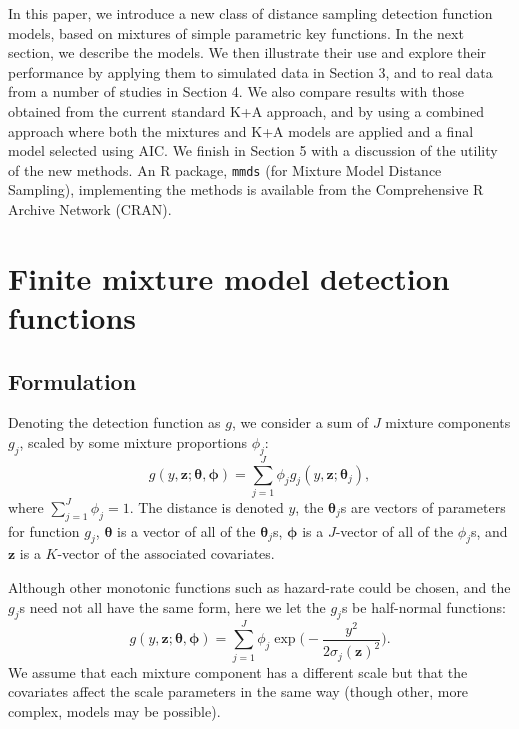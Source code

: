 \documentclass[authoryear,preprint,review,12pt]{elsarticle}
\begin{document}
In this paper, we introduce a new class of distance sampling detection function models, based on mixtures of simple parametric key functions.  In the next section, we describe the models.  We then illustrate their use and explore their performance by applying them to simulated data in Section 3, and to real data from a number of studies in Section 4. We also compare results with those obtained from the current standard K+A approach, and by using a combined approach where both the mixtures and K+A models are applied and a final model selected using AIC.  We finish in Section 5 with a discussion of the utility of the new methods.  An \textsf{R} \citep{Team:2013wf} package, \texttt{mmds} (for Mixture Model Distance Sampling), implementing the methods is available from the Comprehensive R Archive Network (CRAN).

\section{Finite mixture model detection functions}

\subsection{Formulation}
\label{s:detfcts}

Denoting the detection function as $g$, we consider a sum of $J$ mixture components $g_j$, scaled by some mixture proportions $\phi_j$:
\begin{equation*}
g(y,\mathbf{z}; \bm{\theta}, \bm{\phi}) = \sum_{j=1}^J \phi_j g_j(y,\mathbf{z}; \bm{\theta}_j),
\end{equation*}
where $\sum_{j=1}^J \phi_j = 1$. The distance is denoted $y$, the $\bm{\theta}_j$s are vectors of parameters for function $g_j$, $\bm{\theta}$ is a vector of all of the $\bm{\theta}_j$s, $\bm{\phi}$ is a $J$-vector of all of the $\phi_j$s, and $\mathbf{z}$ is a $K$-vector of the associated covariates.  

Although other monotonic functions such as hazard-rate could be chosen, and the $g_j$s need not all have the same form, here we let the $g_j$s be half-normal functions:
\begin{equation*}
g(y,\mathbf{z}; \bm{\theta}, \bm{\phi}) = \sum_{j=1}^J \phi_j \exp \Big( - \frac{y^2}{2\sigma_j(\mathbf{z})^2} \Big).
\end{equation*}
We assume that each mixture component has a different scale but that the covariates affect the scale parameters in the same way (though other, more complex, models may be possible).
\end{document}
